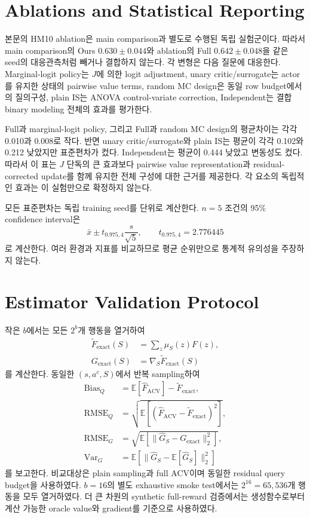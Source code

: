 \documentclass[10pt,journal]{IEEEtran}
\newcommand{\E}{\mathbb{E}}
\begin{document}
\section{Ablations and Statistical Reporting}
\label{sec:ablations}

본문의 HM10 ablation은 main comparison과 별도로 수행된 독립 실험군이다. 따라서 main comparison의 Ours $0.630\pm0.044$와 ablation의 Full $0.642\pm0.048$을 같은 seed의 대응관측처럼 빼거나 결합하지 않는다. 각 변형은 다음 질문에 대응한다. Marginal-logit policy는 $J$에 의한 logit adjustment, unary critic/surrogate는 actor를 유지한 상태의 pairwise value terms, random MC design은 동일 row budget에서의 질의구성, plain IS는 ANOVA control-variate correction, Independent는 결합 binary modeling 전체의 효과를 평가한다.

Full과 marginal-logit policy, 그리고 Full과 random MC design의 평균차이는 각각 0.010과 0.008로 작다. 반면 unary critic/surrogate와 plain IS는 평균이 각각 0.102와 0.212 낮았지만 표준편차가 컸다. Independent는 평균이 0.444 낮았고 변동성도 컸다. 따라서 이 표는 $J$ 단독의 큰 효과보다 pairwise value representation과 residual-corrected update를 함께 유지한 전체 구성에 대한 근거를 제공한다. 각 요소의 독립적인 효과는 이 실험만으로 확정하지 않는다.

모든 표준편차는 독립 training seed를 단위로 계산한다. $n=5$ 조건의 95\% confidence interval은
\begin{equation}
\bar x\pm t_{0.975,4}\frac{s}{\sqrt5},
\qquad t_{0.975,4}=2.776445
\end{equation}
로 계산한다. 여러 환경과 지표를 비교하므로 평균 순위만으로 통계적 유의성을 주장하지 않는다.

\section{Estimator Validation Protocol}
\label{sec:estimator-validation}

작은 $b$에서는 모든 $2^b$개 행동을 열거하여
\begin{align}
\widetilde F_{\mathrm{exact}}(S)&=\sum_z\mu_S(z)F(z),\\
G_{\mathrm{exact}}(S)&=\nabla_S\widetilde F_{\mathrm{exact}}(S)
\end{align}
를 계산한다. 동일한 $(s,a^c,S)$에서 반복 sampling하여
\begin{align}
\mathrm{Bias}_Q&=\E[\widehat F_{\mathrm{ACV}}]-\widetilde F_{\mathrm{exact}},\\
\mathrm{RMSE}_Q&=\sqrt{\E[(\widehat F_{\mathrm{ACV}}-\widetilde F_{\mathrm{exact}})^2]},\\
\mathrm{RMSE}_G&=\sqrt{\E[\|\widehat G_S-G_{\mathrm{exact}}\|_2^2]},\\
\mathrm{Var}_G&=\E[\|\widehat G_S-\E[\widehat G_S]\|_2^2]
\end{align}
를 보고한다. 비교대상은 plain sampling과 full ACV이며 동일한 residual query budget을 사용하였다. $b=16$의 별도 exhaustive smoke test에서는 $2^{16}=65{,}536$개 행동을 모두 열거하였다. 더 큰 차원의 synthetic full-reward 검증에서는 생성함수로부터 계산 가능한 oracle value와 gradient를 기준으로 사용하였다.
\end{document}

